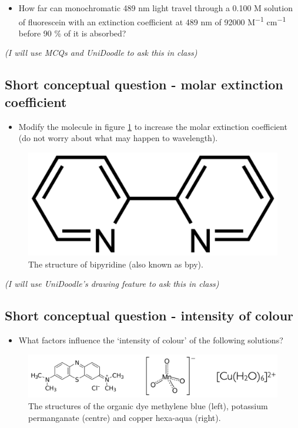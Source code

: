 \documentclass[
]{book}
\providecommand{\tightlist}{%
  \setlength{\itemsep}{0pt}\setlength{\parskip}{0pt}}
\begin{document}
\begin{itemize}
\tightlist
\item
  How far can monochromatic 489 nm light travel through a 0.100 M solution of fluorescein with an extinction coefficient at 489 nm of 92000 M\textsuperscript{−1} cm\textsuperscript{−1} before 90 \% of it is absorbed?
\end{itemize}

\emph{(I will use MCQs and UniDoodle to ask this in class)}

\hypertarget{subsec:MolarExtinction}{%
\subsection{Short conceptual question - molar extinction coefficient}\label{subsec:MolarExtinction}}

\begin{itemize}
\tightlist
\item
  Modify the molecule in figure \ref{fig:bpy1} to increase the molar extinction coefficient (do not worry about what may happen to wavelength).
\end{itemize}

\begin{figure}

{\centering \includegraphics[width=0.3\linewidth]{images/bpy} 

}

\caption{The structure of bipyridine (also known as bpy).}\label{fig:bpy1}
\end{figure}

\emph{(I will use UniDoodle's drawing feature to ask this in class)}

\hypertarget{subsec:intensity}{%
\subsection{Short conceptual question - intensity of colour}\label{subsec:intensity}}

\begin{itemize}
\tightlist
\item
  What factors influence the `intensity of colour' of the following solutions?
\end{itemize}

\begin{figure}

{\centering \includegraphics[width=0.7\linewidth]{images/molarextquestion} 

}

\caption{The structures of the organic dye methylene blue (left), potassium permanganate (centre) and copper hexa-aqua (right).}\label{fig:molarextstructures1}
\end{figure}
\end{document}
